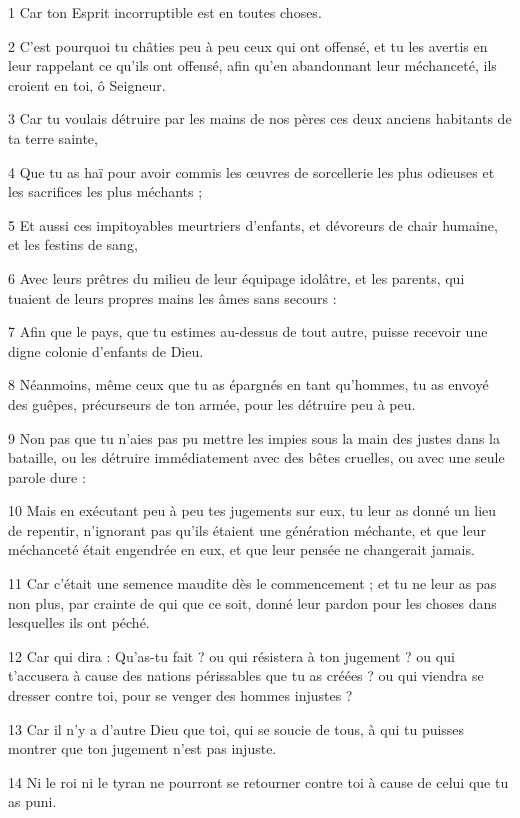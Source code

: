 \par 1 Car ton Esprit incorruptible est en toutes choses.
\par 2 C'est pourquoi tu châties peu à peu ceux qui ont offensé, et tu les avertis en leur rappelant ce qu'ils ont offensé, afin qu'en abandonnant leur méchanceté, ils croient en toi, ô Seigneur.
\par 3 Car tu voulais détruire par les mains de nos pères ces deux anciens habitants de ta terre sainte,
\par 4 Que tu as haï pour avoir commis les œuvres de sorcellerie les plus odieuses et les sacrifices les plus méchants ;
\par 5 Et aussi ces impitoyables meurtriers d'enfants, et dévoreurs de chair humaine, et les festins de sang,
\par 6 Avec leurs prêtres du milieu de leur équipage idolâtre, et les parents, qui tuaient de leurs propres mains les âmes sans secours :
\par 7 Afin que le pays, que tu estimes au-dessus de tout autre, puisse recevoir une digne colonie d'enfants de Dieu.
\par 8 Néanmoins, même ceux que tu as épargnés en tant qu'hommes, tu as envoyé des guêpes, précurseurs de ton armée, pour les détruire peu à peu.
\par 9 Non pas que tu n'aies pas pu mettre les impies sous la main des justes dans la bataille, ou les détruire immédiatement avec des bêtes cruelles, ou avec une seule parole dure :
\par 10 Mais en exécutant peu à peu tes jugements sur eux, tu leur as donné un lieu de repentir, n'ignorant pas qu'ils étaient une génération méchante, et que leur méchanceté était engendrée en eux, et que leur pensée ne changerait jamais.
\par 11 Car c'était une semence maudite dès le commencement ; et tu ne leur as pas non plus, par crainte de qui que ce soit, donné leur pardon pour les choses dans lesquelles ils ont péché.
\par 12 Car qui dira : Qu'as-tu fait ? ou qui résistera à ton jugement ? ou qui t'accusera à cause des nations périssables que tu as créées ? ou qui viendra se dresser contre toi, pour se venger des hommes injustes ?
\par 13 Car il n'y a d'autre Dieu que toi, qui se soucie de tous, à qui tu puisses montrer que ton jugement n'est pas injuste.
\par 14 Ni le roi ni le tyran ne pourront se retourner contre toi à cause de celui que tu as puni.
